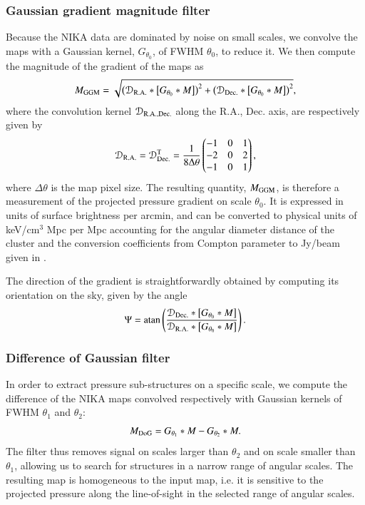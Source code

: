 \documentclass[twocolumn,traditabstract]{aa}
\begin{document}
\subsubsection{Gaussian gradient magnitude filter}
Because the NIKA data are dominated by noise on small scales, we convolve the maps with a Gaussian kernel, $G_{\theta_0}$, of FWHM $\theta_0$, to reduce it. We then compute the magnitude of the gradient of the maps as 
\begin{equation}
	M_{\rm GGM} = \sqrt{\left(\mathcal{D}_{\rm R.A.} \ast \left[G_{\theta_0} \ast M\right]\right)^2 + \left(\mathcal{D}_{\rm Dec.} \ast \left[G_{\theta_0} \ast M\right]\right)^2},
	\label{eq:GGM_filter}
\end{equation}
where the convolution kernel $\mathcal{D}_{\rm R.A., Dec.}$ along the R.A., Dec. axis, are respectively given by
\begin{equation}
	\mathcal{D}_{\rm R.A.}= \mathcal{D}_{\rm Dec.}^{\rm T} = \frac{1}{8 \Delta \theta}
	\begin{pmatrix}
	-1 & 0 & 1\\
	-2 & 0 & 2\\
	-1 & 0 & 1
	\end{pmatrix},
	\label{eq:GGM_kernel}
\end{equation}
where $\Delta \theta$ is the map pixel size. The resulting quantity, $M_{\rm GGM}$, is therefore a measurement of the projected pressure gradient on scale $\theta_0$. It is expressed in units of surface brightness per arcmin, and can be converted to physical units of keV/cm$^3$ Mpc per Mpc accounting for the angular diameter distance of the cluster and the conversion coefficients from Compton parameter to Jy/beam given in \cite{Adam2016b}.

The direction of the gradient is straightforwardly obtained by computing its orientation on the sky, given by the angle
\begin{equation}
	\Psi = {\rm atan} \left( \frac{\mathcal{D}_{\rm Dec.} \ast \left[G_{\theta_0} \ast M\right]}{\mathcal{D}_{\rm R.A.} \ast \left[G_{\theta_0} \ast M\right]} \right).
	\label{eq:GGM_angle}
\end{equation}

\subsubsection{Difference of Gaussian filter}
In order to extract pressure sub-structures on a specific scale, we compute the difference of the NIKA maps convolved respectively with Gaussian kernels of FWHM $\theta_1$ and $\theta_2$:
\begin{equation}
	M_{\rm DoG} = G_{\theta_1} \ast M - G_{\theta_2} \ast M.
	\label{eq:DoG_filter}
\end{equation}
The filter thus removes signal on scales larger than $\theta_2$ and on scale smaller than $\theta_1$, allowing us to search for structures in a narrow range of angular scales. The resulting map is homogeneous to the input map, i.e. it is sensitive to the projected pressure along the line-of-sight in the selected range of angular scales.
\end{document}
